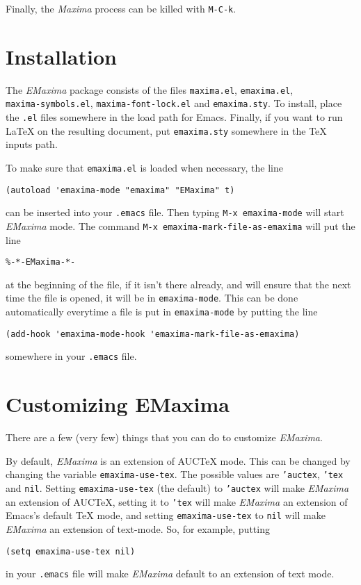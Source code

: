 \documentclass{article}
\newcommand{\emx}{\textsl{\sffamily EMaxima}}
\newcommand{\mx}{\textsl{\sffamily Maxima}}
\begin{document}
Finally, the \mx{} process can be killed with \texttt{M-C-k}.

\newpage
\appendix

\section{Installation}

\noindent
The \emx{} package consists of the files \texttt{maxima.el},
\texttt{emaxima.el},\\
\texttt{maxima-symbols.el},
\texttt{maxima-font-lock.el}  and \texttt{emaxima.sty}.
To install, place the \texttt{.el} files somewhere in the
load path for Emacs.
Finally, if you want to run \LaTeX{} on the resulting document, put
\texttt{emaxima.sty} somewhere in the \TeX{} inputs path.

To make sure that \texttt{emaxima.el} is loaded when necessary, the line
\begin{verbatim}
(autoload 'emaxima-mode "emaxima" "EMaxima" t)
\end{verbatim}
\noindent
can be inserted into your \texttt{.emacs} file.  Then typing
\texttt{M-x emaxima-mode} will start \emx{} mode.  The command 
\texttt{M-x emaxima-mark-file-as-emaxima} will put the line
\begin{verbatim}
%-*-EMaxima-*-
\end{verbatim}
\noindent
at the beginning of the file, if it isn't there already, and will ensure
that the next time the file is opened, it will be in \texttt{emaxima-mode}.  
This can be done automatically everytime a file is put in
\texttt{emaxima-mode} by putting the line
\begin{verbatim}
(add-hook 'emaxima-mode-hook 'emaxima-mark-file-as-emaxima)
\end{verbatim}
\noindent
somewhere in your \texttt{.emacs} file.

\section{Customizing EMaxima}

\noindent
There are a few (very few) things that you can do to customize \emx{}.  

By default, \emx{} is an extension of AUC\TeX{} mode.  This can be
changed by changing the variable \texttt{emaxima-use-tex}.  The possible
values are \texttt{'auctex}, \texttt{'tex} and \texttt{nil}.  Setting
\texttt{emaxima-use-tex} (the default) to \texttt{'auctex} will make \emx{}
an extension of AUC\TeX{}, setting it to \texttt{'tex} will make \emx{} an
extension of Emacs's default \TeX{} mode, and setting
\texttt{emaxima-use-tex} to \texttt{nil} will make \emx{} an extension of
text-mode.  So, for example, putting 
\begin{verbatim}
(setq emaxima-use-tex nil)
\end{verbatim}
\noindent
in your \texttt{.emacs} file will make \emx{} default to an extension of
text mode. 
\end{document}
